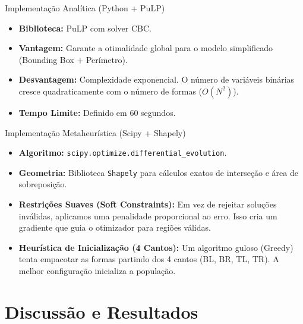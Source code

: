 \documentclass{beamer}
\begin{document}
\begin{frame}{Implementação Analítica (Python + PuLP)}
    \begin{itemize}
        \item \textbf{Biblioteca:} PuLP com solver CBC.
        \item \textbf{Vantagem:} Garante a otimalidade global para o modelo simplificado (Bounding Box + Perímetro).
        \item \textbf{Desvantagem:} Complexidade exponencial. O número de variáveis binárias cresce quadraticamente com o número de formas ($O(N^2)$).
        \item \textbf{Tempo Limite:} Definido em 60 segundos.
    \end{itemize}
\end{frame}

\begin{frame}{Implementação Metaheurística (Scipy + Shapely)}
    \begin{itemize}
        \item \textbf{Algoritmo:} \texttt{scipy.optimize.differential\_evolution}.
        \item \textbf{Geometria:} Biblioteca \texttt{Shapely} para cálculos exatos de interseção e área de sobreposição.
        \item \textbf{Restrições Suaves (Soft Constraints):}
        Em vez de rejeitar soluções inválidas, aplicamos uma penalidade proporcional ao erro. Isso cria um gradiente que guia o otimizador para regiões válidas.
        \item \textbf{Heurística de Inicialização (4 Cantos):}
        Um algoritmo guloso (Greedy) tenta empacotar as formas partindo dos 4 cantos (BL, BR, TL, TR). A melhor configuração inicializa a população.
    \end{itemize}
\end{frame}

\section{Discussão e Resultados}
\end{document}
